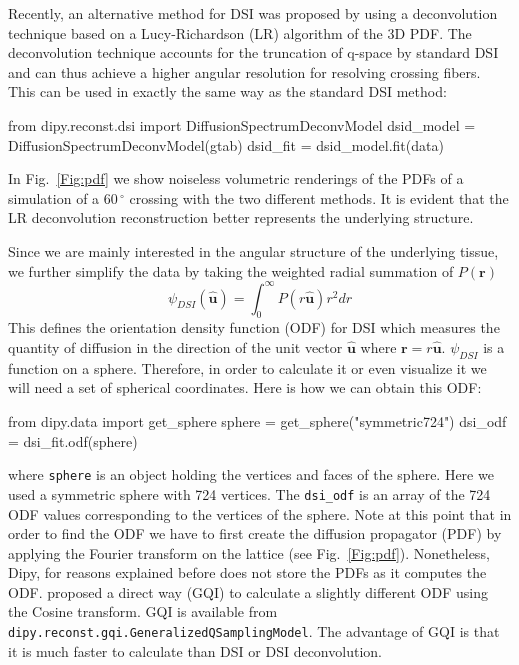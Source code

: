 \documentclass{bioinfo}
\begin{document}
Recently, an alternative method for DSI was proposed by
\citet{canales-rodriguez-etal:10} using a deconvolution technique
based on a Lucy-Richardson (LR) algorithm of the 3D PDF. The
deconvolution technique accounts for the truncation of q-space by
standard DSI and can thus achieve a higher angular resolution for
resolving crossing fibers. This can be used in exactly the same way as
the standard DSI method:
\begin{python}
from dipy.reconst.dsi import
                      DiffusionSpectrumDeconvModel
dsid_model = DiffusionSpectrumDeconvModel(gtab)
dsid_fit = dsid_model.fit(data)
\end{python}

In Fig.~\ref{Fig:pdf} we show noiseless volumetric renderings of the PDFs of
a simulation of a $60\,^{\circ}$ crossing with the two different methods. It
is evident that the LR deconvolution reconstruction better represents the
underlying structure.

Since we are mainly interested in the angular structure of the underlying
tissue, we further simplify the data by taking the weighted radial summation of
$P(\mathbf{r})$
\begin{equation}
\psi_{DSI}(\hat{\mathbf{u}})=\int_{0}^{\infty}P(r\hat{\mathbf{u}})r^{2}dr\label{eq:ODF_DSI}
\end{equation}
\noindent This defines the orientation density function (ODF) for DSI which
measures the quantity of diffusion in the direction of the unit vector
$\mathbf{\hat{u}}$ where $\mathbf{r=}r\hat{\mathbf{u}}$. $\psi_{DSI}$ is a
function on a sphere. Therefore, in order to calculate it or even visualize it
we will need a set of spherical coordinates. Here is how we can obtain this ODF:
\begin{python}
from dipy.data import get_sphere
sphere = get_sphere("symmetric724")
dsi_odf = dsi_fit.odf(sphere)
\end{python}
where \texttt{sphere} is an object holding the vertices and faces of the
sphere. Here we used a symmetric sphere with 724 vertices. The
\texttt{dsi\_odf} is an array of the 724 ODF values corresponding to the
vertices of the sphere. Note at this point that in order to find the ODF we
have to first create the diffusion propagator (PDF) by applying the Fourier transform
on the lattice (see Fig.~\ref{Fig:pdf}). Nonetheless, Dipy, for reasons explained before does not store
the PDFs as it computes the ODF. \cite{yeh-etal:10} proposed a direct way (GQI) to
calculate a slightly different ODF using the Cosine transform. GQI is
available from \texttt{dipy.reconst.gqi.GeneralizedQSamplingModel}. The
advantage of GQI is that it is much faster to calculate than DSI or DSI
deconvolution.
\end{document}
